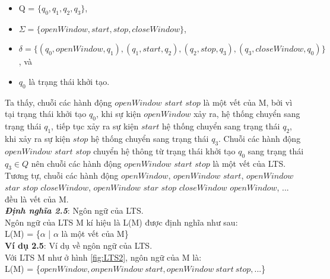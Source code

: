 \documentclass[a4paper,13pt,oneside,openany]{book}
\begin{document}
\begin{flushleft}
		\begin{itemize}
			\item Q = $\{q_0, q_1, q_2, q_3\}$,
			\item $\Sigma = \{openWindow, start, stop, closeWindow\}$,
			\item $\delta = \{(q_0, openWindow, q_1), (q_1, start, q_2), (q_2, stop, q_3), (q_3, closeWindow, q_0)\}$, và
			\item $q_0$ là trạng thái khởi tạo.
		\end{itemize}
		Ta thấy, chuỗi các hành động $openWindow$ $start$ $stop$ là một vết của M, bởi vì tại trạng thái khởi tạo $q_0$, khi sự kiện $openWindow$ xảy ra, hệ thống chuyển sang trạng thái $q_1$, tiếp tục xảy ra sự kiện $start$ hệ thống chuyển sang trạng thái $q_2$, khi xảy ra sự kiện $stop$ hệ thống chuyển sang trạng thái $q_3$. Chuỗi các hành động $openWindow$ $start$ $stop$ chuyển hệ thông từ trạng thái khởi tạo $q_0$ sang trạng thái $q_3 \in Q$ nên chuỗi các hành động  $openWindow$ $start$ $stop$ là một vết của LTS. Tương tự, chuỗi các hành động $openWindow$, $openWindow$ $start$, $openWindow$ $star$ $stop$ $closeWindow$, $openWindow$ $star$ $stop$ $closeWindow$ $openWindow$, ... đều là vết của M.\\
		\textbf{\textit{Định nghĩa 2.5}}: Ngôn ngữ của LTS.\\
		Ngôn ngữ của LTS M kí hiệu là L(M) được định nghĩa như sau:\\
		L(M) = \{$\alpha$ | $\alpha$ là một vết của M\}\\
		\textbf{Ví dụ 2.5}: Ví dụ về ngôn ngữ của LTS.\\
		Với LTS M như ở hình \ref{fig:LTS2}, ngôn ngữ của M là:\\
		L(M) = \{$openWindow, onpenWindow\ start, openWindow \ start \ stop, ...$\}

\end{flushleft}
\end{document}
